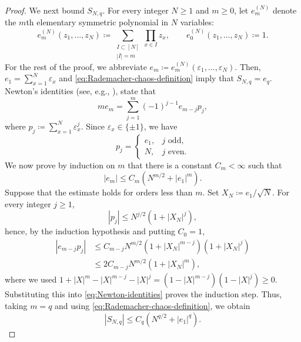 \documentclass[../CLT_SYK.tex]{subfiles}
\begin{document}
\begin{proof}
  We next bound $S_{N,q}$.  For every integer $N\geq1$ and $m\geq0$, let $e_m^{(N)}$ denote the $m$th elementary symmetric polynomial in $N$ variables:
  \begin{equation*}
    e_m^{(N)}(z_1,\ldots,z_N)
    \coloneqq
      \sum_{
        \substack{
          I\subset[N]\\
          |I|=m
        }
      }
      \prod_{x\in I}
      z_x,
    \qquad
    e_0^{(N)}(z_1,\ldots,z_N)
    \coloneqq
      1.
  \end{equation*}
  For the rest of the proof, we abbreviate $e_m \coloneqq e_m^{(N)}(\varepsilon_1,\ldots,\varepsilon_N)$.
  Then, $e_1=\sum_{x=1}^N\varepsilon_x$ and \eqref{eq:Rademacher-chaos-definition} imply that $S_{N,q}=e_q$.
  Newton's identities (see, e.g., \cite[Chapter I, \S2]{Macdonald1995}), state that
  \begin{equation}\label{eq:Newton-identities}
    m e_m
    =\sum_{j=1}^m(-1)^{j-1}e_{m-j}p_j,
  \end{equation}
  where $p_j \coloneqq \sum_{x=1}^N\varepsilon_x^j$.  Since
  $\varepsilon_x\in\{\pm1\}$, we have
  \begin{equation*}
    p_j
    =
      \begin{cases}
        e_1, & j\text{ odd},  \\
        N,   & j\text{ even}.
      \end{cases}
  \end{equation*}
  We now prove by induction on $m$ that there is a constant $C_m < \infty$ such that
  \begin{equation*}
    |e_m|
    \le C_m\left(N^{m/2}+|e_1|^m\right).
  \end{equation*}
  Suppose that the estimate holds for  orders less than $m$.
  Set $X_N \coloneqq e_1 / \sqrt N$.
  For every integer $j\ge1$,
  \[
    |p_j| \le N^{j/2} \left(1 + |X_N|^j\right),
  \]
  hence, by the induction hypothesis and putting $C_0 = 1$,
  \begin{align*}
    |e_{m-j}p_j|
    &\le
      C_{m-j}N^{m/2}
      (1+|X_N|^{m-j})(1+|X_N|^j)\\
    &\le
      2C_{m-j}N^{m/2}(1+|X_N|^m),
  \end{align*}
  where we used $1+|X|^m-|X|^{m-j}-|X|^j = (1-|X|^{m-j})(1-|X|^j) \ge 0$.
  Substituting this into \eqref{eq:Newton-identities} proves the induction step.
  Thus, taking $m=q$ and using \eqref{eq:Rademacher-chaos-definition}, we obtain
  \begin{equation}\label{eq:Rademacher-chaos-deterministic-bound}
    |S_{N,q}|
    \leq C_q\left(N^{q/2}+|e_1|^q\right).
  \end{equation}


\end{proof}
\end{document}
